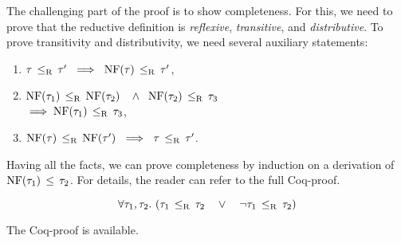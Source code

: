 The challenging part of the proof is to show completeness. 
For this, we need to prove that 
the reductive definition is \emph{reflexive}, \emph{transitive},
and \emph{distributive}.
To prove transitivity and distributivity, 
we need several auxiliary statements:
\begin{enumerate}
  \item $\bjsubr{\ty}{\ty'}\ \implies\ \bjsubr{\NF(\ty)}{\ty'}$,
  \item $\bjsubr{\NF(\ty_1)}{\NF(\ty_2)}\;\;\ \land\;\; \bjsubr{\NF(\ty_2)}{\ty_3}$\\
     $\implies \mathop{\mathrm{NF}}(\tau_1) \, \leq_\mathrm{R} \, \tau_3$,
  \item $\bjsubr{\NF(\ty)}{\NF(\ty')}\ \implies\ \bjsubr{\ty}{\ty'}$.
\end{enumerate}
Having all the facts, we can prove completeness by induction
on a derivation of $\mathop{\mathrm{NF}}(\tau_1) \, \leq \, \tau_2$.
For details, the reader can refer to the full Coq-proof.

\begin{theorem}\label{thm:redsub-decidable}
\[
\forall \ty_1, \ty_2.\ 
(\bjsubr{\ty_1}{\ty_2}\quad \lor\quad \lnot \bjsubr{\ty_1}{\ty_2})
\]
\end{theorem}
\noindent
The Coq-proof is available.

